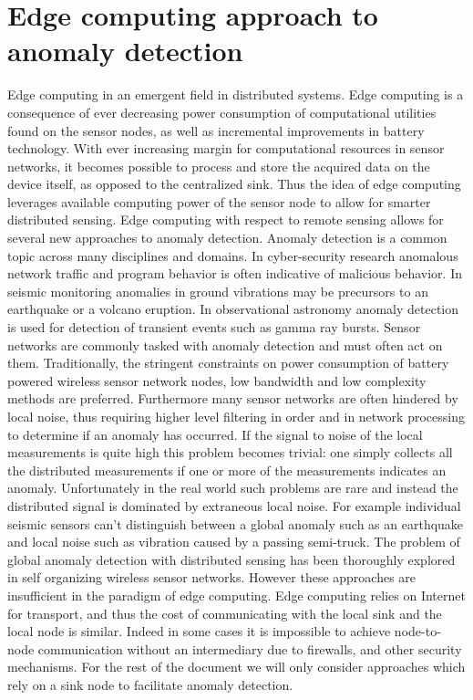 \section{Edge computing approach to anomaly detection}\label{intro:edge}
Edge computing in an emergent field in distributed systems. Edge computing is a consequence of ever decreasing power consumption of computational utilities found on the sensor nodes, as well as incremental improvements in battery technology. With ever increasing margin for computational resources in sensor networks, it becomes possible to process and store the acquired data on the device itself, as opposed to the centralized sink. Thus the idea of edge computing leverages available computing power of the sensor node to allow for smarter distributed sensing. Edge computing with respect to remote sensing allows for several new approaches to anomaly detection. Anomaly detection is a common topic across many disciplines and domains. In cyber-security research anomalous network traffic and program behavior is often indicative of malicious behavior. In seismic monitoring anomalies in ground vibrations may be precursors to an earthquake or a volcano eruption. In observational astronomy anomaly detection is used for detection of transient events such as gamma ray bursts. Sensor networks are commonly tasked with anomaly detection and must often act on them. Traditionally, the stringent constraints on power consumption of battery powered wireless sensor network nodes, low bandwidth and low complexity methods are preferred. Furthermore many sensor networks are often hindered by local noise, thus requiring higher level filtering in order and in network processing to determine if an anomaly has occurred. If the signal to noise of the local measurements is quite high this problem becomes trivial: one simply collects all the distributed measurements if one or more of the measurements indicates an anomaly. Unfortunately in the real world such problems are rare and instead the distributed signal is dominated by extraneous local noise. For example individual seismic sensors can’t distinguish between a global anomaly such as an earthquake and local noise such as vibration caused by a passing semi-truck. The problem of global anomaly detection with distributed sensing has been thoroughly explored in self organizing wireless sensor networks. However these approaches are insufficient in the paradigm of edge computing. Edge computing relies on Internet for transport, and thus the cost of communicating with the local sink and the local node is similar. Indeed in some cases it is impossible to achieve node-to-node communication without an intermediary due to firewalls, and other security mechanisms. For the rest of the document we will only consider approaches which rely on a sink node to facilitate anomaly detection.

